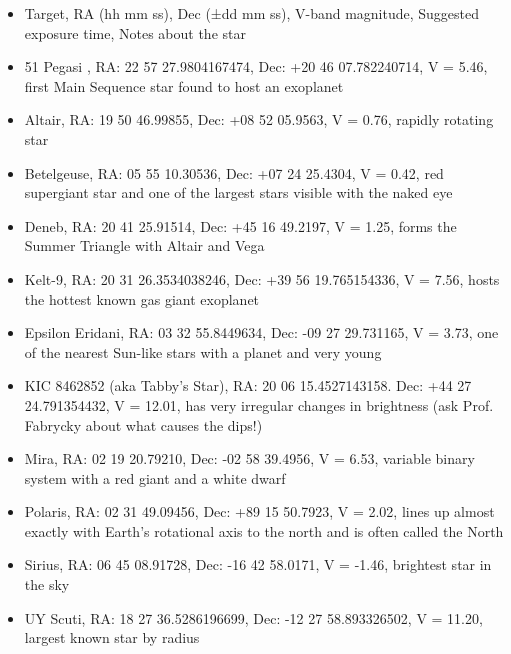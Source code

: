 \begin{itemize}

	\item Target, RA (hh mm ss), Dec (±dd mm ss), V-band magnitude, Suggested exposure time, Notes about the star
	
	\item 51 Pegasi , RA: 22 57 27.9804167474, Dec: +20 46 07.782240714, V = 5.46, first Main Sequence star found to host an exoplanet
	
	\item Altair, RA: 19 50 46.99855, Dec: +08 52 05.9563, V = 0.76, rapidly rotating star
	
	\item Betelgeuse, RA: 05 55 10.30536, Dec: +07 24 25.4304, V = 0.42, red supergiant star and one of the largest stars visible with the naked eye

	\item Deneb, RA: 20 41 25.91514, Dec: +45 16 49.2197, V = 1.25, forms the Summer Triangle with Altair and Vega 
	
	\item Kelt-9, RA: 20 31 26.3534038246, Dec: +39 56 19.765154336, V = 7.56, hosts the hottest known gas giant exoplanet
	
	\item Epsilon Eridani, RA: 03 32 55.8449634, Dec: -09 27 29.731165, V = 3.73, one of the nearest Sun-like stars with a planet and very young
	
	\item KIC 8462852 (aka Tabby's Star), RA: 20 06 15.4527143158. Dec: +44 27 24.791354432, V = 12.01, has very irregular changes in brightness (ask Prof. Fabrycky about what causes the dips!)
	
	\item Mira, RA: 02 19 20.79210, Dec: -02 58 39.4956, V = 6.53, variable binary system with a red giant and a white dwarf
	
	\item Polaris, RA: 02 31 49.09456,  Dec: +89 15 50.7923, V = 2.02, lines up almost exactly with Earth's rotational axis to the north and is often called the North
	
	\item Sirius, RA: 06 45 08.91728, Dec: -16 42 58.0171, V = -1.46, brightest star in the sky
	
	\item UY Scuti, RA: 18 27 36.5286196699, Dec: -12 27 58.893326502, V = 11.20, largest known star by radius
	

\end{itemize}

